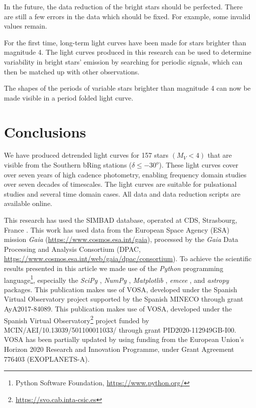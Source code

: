 \documentclass{aa}
\begin{document}
In the future, the data reduction of the bright stars should be perfected.
%
There are still a few errors in the data which should be fixed.
%
For example, some invalid values remain.

For the first time, long-term light curves have been made for stars brighter than magnitude 4.
%
The light curves produced in this research can be used to determine variability in bright stars' emission by searching for periodic signals, which can then be matched up with other observations.
%

The shapes of the periods of variable stars brighter than magnitude 4 can now be made visible in a period folded light curve.

\section{Conclusions}

\label{sec:conclusion}

We have produced detrended light curves for 157 stars $(M_V<4)$ that are visible from the Southern bRing stations ($\delta \leq -30^o$).
%
These light curves cover over seven years of high cadence photometry, enabling frequency domain studies over seven decades of timescales.
%
The light curves are suitable for pulsational studies and several time domain cases.
%
All data and data reduction scripts are available online.

\begin{acknowledgements}

This research has used the SIMBAD database, operated at CDS, Strasbourg, France \citep{wenger2000}.
%
This work has used data from the European Space Agency (ESA) mission {\it Gaia} (\url{https://www.cosmos.esa.int/gaia}), processed by the {\it Gaia} Data Processing and Analysis Consortium (DPAC, \url{https://www.cosmos.esa.int/web/gaia/dpac/consortium}).
%
To achieve the scientific results presented in this article we made use of the \emph{Python} programming language\footnote{Python Software Foundation, \url{https://www.python.org/}}, especially the \emph{SciPy} \citep{virtanen2020}, \emph{NumPy} \citep{numpy}, \emph{Matplotlib} \citep{Matplotlib}, \emph{emcee} \citep{foreman-mackey2013}, and \emph{astropy} \citep{astropy_1,astropy_2} packages.
%
This publication makes use of VOSA, developed under the Spanish Virtual Observatory project supported by the Spanish MINECO through grant AyA2017-84089.
%
This publication makes use of VOSA, developed under the Spanish Virtual Observatory\footnote{\url{https://svo.cab.inta-csic.es}} project funded by MCIN/AEI/10.13039/501100011033/ through grant PID2020-112949GB-I00.
%
VOSA has been partially updated by using funding from the European Union's Horizon 2020 Research and Innovation Programme, under Grant Agreement 776403 (EXOPLANETS-A). 
%
\end{acknowledgements}
\end{document}
